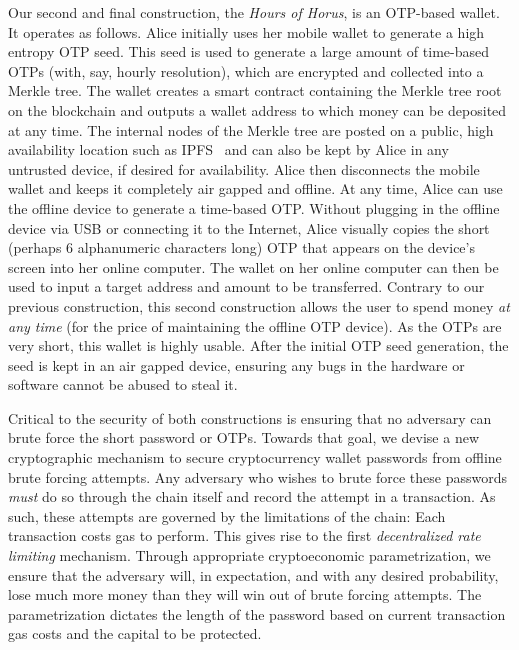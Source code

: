 Our second and final construction, the \emph{Hours of Horus},
is an OTP-based wallet. It operates as follows.
Alice initially uses her mobile wallet to generate a high entropy OTP seed.
This seed is used to generate
a large amount of time-based OTPs (with, say, hourly resolution), which are encrypted
and collected into a Merkle tree. The wallet creates a smart contract containing the
Merkle tree root on the blockchain and outputs a wallet address to which money can
be deposited at any time. The internal nodes of the Merkle tree are posted on a public,
high availability location such as IPFS~\cite{ipfs} and can also be kept by Alice
in any untrusted device, if desired for availability. Alice then disconnects the mobile wallet and keeps it
completely air gapped and offline. At any time, Alice can use the offline device to generate
a time-based OTP. Without plugging in the offline device via USB or connecting it
to the Internet, Alice visually copies the short (perhaps $6$ alphanumeric characters long)
OTP that appears on the device's screen into her online computer. The wallet on
her online computer can then be used to input a target address and amount to be transferred.
Contrary to our previous construction, this second construction allows the user
to spend money \emph{at any time} (for the price of maintaining
the offline OTP device). As the OTPs are very short, this wallet is highly usable.
After the initial OTP seed generation, the seed is kept in an
air gapped device, ensuring any bugs in the hardware or software cannot be abused
to steal it.

Critical to the security of both constructions is ensuring that no adversary can
brute force the short password or OTPs.
Towards that goal, we devise a new cryptographic mechanism to secure cryptocurrency
wallet passwords from offline brute forcing attempts. Any adversary who wishes
to brute force these passwords \emph{must} do so through the chain itself and
record the attempt in a transaction. As such, these attempts are governed by
the limitations of the chain: Each transaction costs gas to perform. This
gives rise to the first \emph{decentralized rate limiting} mechanism. Through
appropriate cryptoeconomic parametrization, we ensure that the adversary will,
in expectation, and with any desired probability, lose much more money than they
will win out of brute forcing attempts. The parametrization dictates the length
of the password based on current transaction gas costs and the capital to be
protected.

